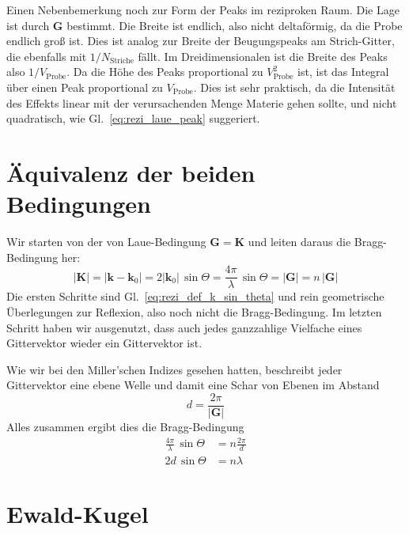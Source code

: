 Einen Nebenbemerkung noch zur Form der Peaks im reziproken Raum. Die Lage ist durch $\mathbf{G}$ bestimmt. Die Breite ist endlich, also nicht deltaförmig, da die Probe endlich groß ist. Dies ist analog zur Breite der Beugungspeaks am Strich-Gitter, die ebenfalls mit $1/N_\text{Striche}$ fällt. Im Dreidimensionalen ist die Breite des Peaks also $1/V_\text{Probe}$. Da die Höhe des Peaks proportional zu $ V_\text{Probe}^2$ ist, ist das Integral über einen Peak proportional zu $ V_\text{Probe}$. Dies ist sehr praktisch, da die Intensität des Effekts linear mit der verursachenden Menge Materie gehen sollte, und nicht quadratisch, wie Gl.~\ref{eq:rezi_laue_peak} suggeriert.


\section{Äquivalenz der beiden Bedingungen}

Wir starten von der von Laue-Bedingung $\mathbf{G} =  \mathbf{K}$ und leiten daraus die Bragg-Bedingung her:
\begin{equation}
 | \mathbf{K} | =  |\mathbf{k} - \mathbf{k}_0| = 2 | \mathbf{k}_0| \, \sin \Theta = \frac{4 \pi}{ \lambda} \, \sin \Theta = | \mathbf{G} | = n \, | \mathbf{G} | 
\end{equation}
Die ersten Schritte sind Gl.~\ref{eq:rezi_def_k_sin_theta} und rein geometrische Überlegungen zur Reflexion, also noch nicht die Bragg-Bedingung. Im letzten Schritt haben wir ausgenutzt, dass auch jedes ganzzahlige Vielfache eines Gittervektor wieder ein Gittervektor ist.

Wie wir bei den Miller'schen Indizes gesehen hatten, beschreibt jeder Gittervektor eine ebene Welle und damit eine Schar von Ebenen im Abstand 
\begin{equation}
 d = \frac{2 \pi}{|\mathbf{G} | }
\end{equation}
 Alles zusammen ergibt dies die Bragg-Bedingung
 \begin{align}
   \frac{4 \pi}{ \lambda} \, \sin \Theta  & = n \frac{2 \pi}{d } \\
   2 d  \, \sin \Theta  & = n \lambda 
 \end{align}
 

\section{Ewald-Kugel} 
 

